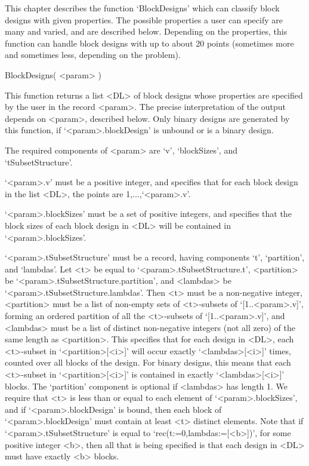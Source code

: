 %
%
%
%
\def\GRAPE{\sf GRAPE}
\def\DESIGN{\sf DESIGN}
\def\nauty{\it nauty}
\def\Aut{{\rm Aut}\,} 


This chapter describes the function `BlockDesigns' which can classify
block designs with given properties.  The possible properties a user
can specify are many and varied, and are described below. Depending on
the properties, this function can handle block designs with up to about
20 points (sometimes more and sometimes less, depending on the problem).


\>BlockDesigns( <param> )

This function returns a list <DL> of block designs whose properties are
specified by the user in the record <param>. The precise interpretation
of the output depends on <param>, described below. Only binary designs
are generated by this function, if `<param>.blockDesign' is unbound
or is a binary design.

The required components of <param> are `v', `blockSizes', and
`tSubsetStructure'.

`<param>.v' must be a positive integer, and specifies that for each block
design in the list <DL>, the points are 1,...,`<param>.v'.

`<param>.blockSizes' must be a set of positive integers, and specifies
that the block sizes of each block design in <DL> will be contained in
`<param>.blockSizes'.

`<param>.tSubsetStructure' must be a record, having
components `t', `partition', and `lambdas'. Let <t>
be equal to `<param>.tSubsetStructure.t', <partition>
be `<param>.tSubsetStructure.partition', and <lambdas> be
`<param>.tSubsetStructure.lambdas'.  Then <t> must be a non-negative
integer, <partition> must be a list of non-empty sets of <t>-subsets of
`[1..<param>.v]', forming an ordered partition of all the <t>-subsets of
`[1..<param>.v]', and <lambdas> must be a list of distinct non-negative
integers (not all zero) of the same length as <partition>. This specifies
that for each design in <DL>, each <t>-subset in `<partition>[<i>]'
will occur exactly `<lambdas>[<i>]' times, counted over all blocks of
the design.  For binary designs, this means that each <t>-subset in
`<partition>[<i>]' is contained in exactly `<lambdas>[<i>]' blocks.
The `partition' component is optional if <lambdas> has length 1.
We require that <t> is less than or equal to each element of
`<param>.blockSizes', and if `<param>.blockDesign' is bound,
then each block of `<param>.blockDesign' must contain at least <t>
distinct elements. Note that if `<param>.tSubsetStructure' is equal to
`rec(t:=0,lambdas:=[<b>])', for some positive integer <b>, then all
that is being specified is that each design in <DL> must have exactly
<b> blocks.

